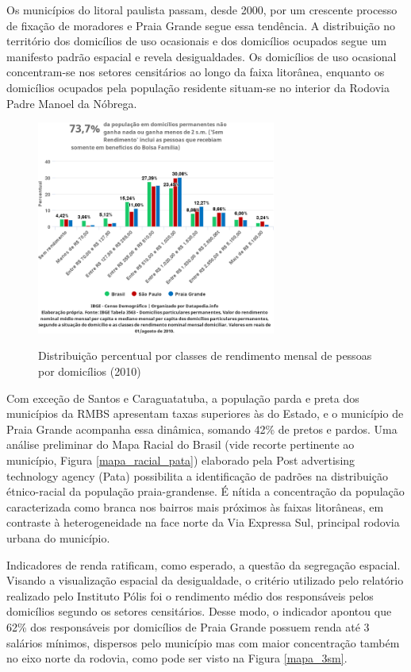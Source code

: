 	Os municípios do litoral paulista passam, desde 2000, por um crescente processo de fixação de moradores e Praia Grande segue essa tendência. A distribuição no território dos domicílios de uso ocasionais e dos domicílios ocupados segue um manifesto padrão espacial e revela desigualdades. Os domicílios de uso ocasional concentram-se nos setores censitários ao longo da faixa litorânea, enquanto os domicílios ocupados pela população residente situam-se no interior da Rodovia Padre Manoel da Nóbrega.
	
	\begin{figure}[tb]
		\centering
		\caption{Distribuição percentual por classes de rendimento mensal de pessoas por domicílios (2010)}
		\includegraphics[width=0.7\textwidth]{img/datapedia.png}
		\label{mapa_datapedia}
	\end{figure}
	
	Com exceção de Santos e Caraguatatuba, a população parda e preta dos municípios da RMBS apresentam taxas superiores às do Estado, e o município de Praia Grande acompanha essa dinâmica, somando 42\% de pretos e pardos. Uma análise preliminar do Mapa Racial do Brasil (vide recorte pertinente ao município, Figura \ref{mapa_racial_pata}) elaborado pela Post advertising technology agency (Pata) possibilita a identificação de padrões na distribuição étnico-racial da população praia-grandense. É nítida a concentração da população caracterizada como branca nos bairros mais próximos às faixas litorâneas, em contraste à heterogeneidade na face norte da Via Expressa Sul, principal rodovia urbana do município.

	Indicadores de renda ratificam, como esperado, a questão da segregação espacial.  Visando a visualização espacial da desigualdade, o critério utilizado pelo relatório realizado pelo Instituto Pólis foi o rendimento médio dos responsáveis pelos domicílios segundo os setores censitários. Desse modo, o indicador apontou que 62\% dos responsáveis por domicílios de Praia Grande possuem renda até 3 salários mínimos, dispersos pelo município mas com maior concentração também no eixo norte da rodovia, como pode ser visto na Figura \ref{mapa_3sm}.
	
